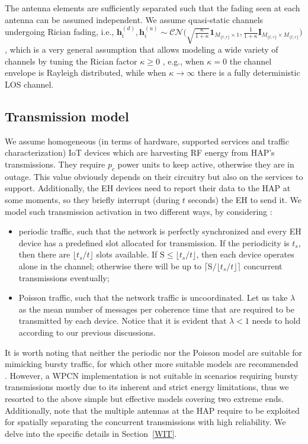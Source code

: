 \documentclass[10pt,journal,a4paper]{IEEEtran}
\begin{document}
	The antenna elements are sufficiently separated such that the fading seen at each antenna can be assumed independent. We assume quasi-static channels undergoing Rician fading, i.e., $\mathbf{h}^{(d)}_i,\mathbf{h}^{(u)}_i\sim\mathcal{CN}\big(\sqrt{\frac{\kappa}{1+\kappa}}\bm{1}_{M_{\{t,r\}}\times 1},\frac{1}{1+\kappa}\mathbf{I}_{M_{\{t,r\}}\times M_{\{t,r\}}}\big)$, which is a very general assumption that allows  modeling a wide variety of channels by tuning the Rician factor $\kappa\ge 0$ \cite[Ch.2]{Proakis.2001}, e.g., when $\kappa=0$ the channel envelope is Rayleigh distributed, while when $\kappa\rightarrow\infty$ there is a fully deterministic LOS channel.
	\subsection{Transmission model}\label{txmodel}
	We assume homogeneous (in terms of hardware, supported services and traffic characterization) IoT devices which are harvesting RF energy from HAP's transmissions. They require $p_c$ power units to keep active, otherwise they are in outage. This value obviously depends on their circuitry but also on the services to support. Additionally, the EH devices need to report their data to the HAP at some moments, so they briefly interrupt  (during $t$ seconds) the EH to send it. We model such transmission activation in two different ways, by considering \cite{Nikaein.2013}:
	\begin{itemize}
		\item periodic traffic, such that the network is perfectly synchronized and every EH device has a predefined slot allocated for transmission. If the periodicity is $t_s$, then there are $\lfloor t_s/t\rfloor$ slots available. If $\mathrm{S}\le \lfloor t_s/t\rfloor$, then each device operates alone in the channel; otherwise there will be up to $\lceil \mathrm{S}/\lfloor t_s/t\rfloor\rceil$ concurrent transmissions eventually;
		\item Poisson traffic, such that the network traffic is uncoordinated. Let us take $\lambda$ as the mean number of messages per coherence time that are required to be transmitted by each device. Notice that it is evident that $\lambda<1$ needs to hold according to our previous discussions. 
	\end{itemize}
	It is worth noting that neither the periodic nor the Poisson model are suitable for mimicking bursty traffic, for which other more suitable models are recommended \cite{Nikaein.2013}. However, a WPCN implementation is not suitable in scenarios requiring bursty transmissions mostly due to its inherent and strict energy limitations, thus we resorted to the above simple but effective models covering two extreme ends. Additionally, note that the multiple antennas at the HAP require to be exploited for spatially separating  the concurrent transmissions with high reliability. We delve into the specific details in Section~\ref{WIT}.
\end{document}
